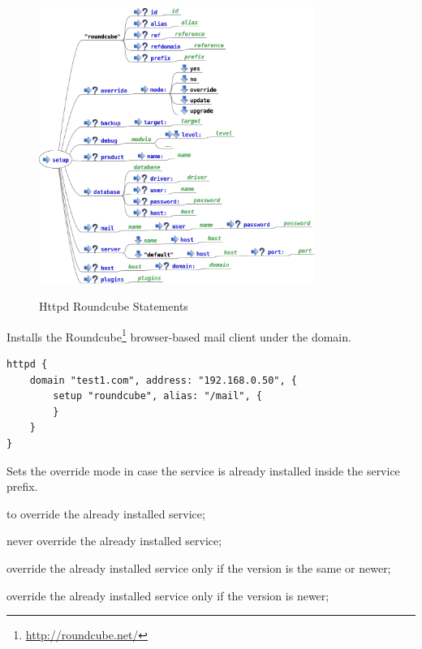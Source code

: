 \begin{figure}[htp]
\centering
\includegraphics[width=0.8\textwidth]{httpd_setup_roundcube_script}
\label{fig:httpd_setup_roundcube_script}
\caption{Httpd Roundcube Statements}
\end{figure}


Installs the Roundcube\footnote{\url{http://roundcube.net/}} browser-based
mail client under the domain.

\begin{lstlisting}[style=Java]
httpd {
    domain "test1.com", address: "192.168.0.50", {
        setup "roundcube", alias: "/mail", {
        }
    }
}
\end{lstlisting}


Sets the override mode in case the service is already installed inside
the service prefix.
\begin{asparaitem}
\item {} to override the already installed service;
\item {} never override the already installed service;
\item {} override the already installed service only if the version is the same or newer;
\item {} override the already installed service only if the version is newer;
\end{asparaitem}

